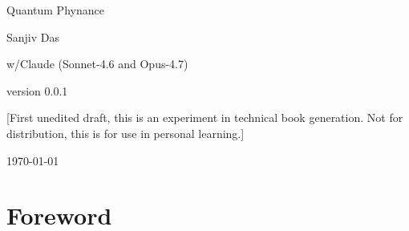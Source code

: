 \documentclass[oneside,11pt]{memoir}
\begin{document}
\thispagestyle{empty}

\begin{center}


{\huge Quantum Phynance}

\vspace*{4ex}

Sanjiv Das 

w/Claude (Sonnet-4.6 and Opus-4.7)

version 0.0.1 

[First unedited draft, this is an experiment in technical book generation. Not for distribution, this is for use in personal learning.]


\end{center}






\begin{flushright}
\footnotesize \dotdate\today
\end{flushright}

\vspace*{-3ex}

\newpage


{
\everymath{\color{black}}
\tableofcontents* %
}

\clearpage

\listoffigures*
{}


\chapter*{Foreword}
\end{document}
